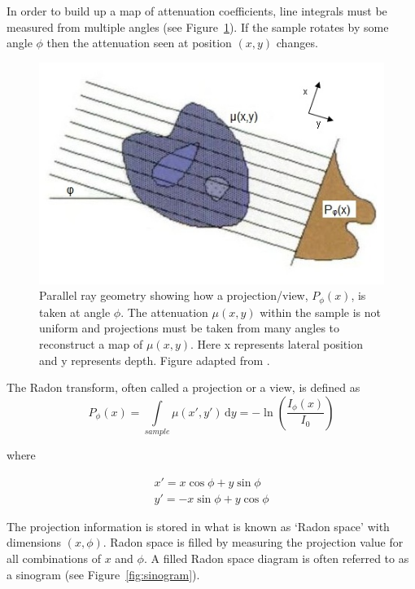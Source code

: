 \documentclass[12pt]{article}
\begin{document}
In order to build up a map of attenuation coefficients, line integrals must be measured from multiple angles (see Figure~\ref{fig:projection}). If the sample rotates by some angle $\phi$ then the attenuation seen at position $(x, y)$  changes.

\begin{figure}[H]
\centering
\includegraphics[scale=0.8]{Russ_projection.jpg}
\caption{Parallel ray geometry showing how a projection/view, $P_{\phi}(x)$, is taken at angle $\phi$. The attenuation $\mu(x,y)$ within the sample is not uniform and projections must be taken from many angles to reconstruct a map of $\mu(x,y)$.  Here x represents lateral position  and y represents  depth. Figure adapted from \cite{russ2002image}.}
\label{fig:projection}
\end{figure}


The Radon transform, often called a projection or a view, is defined as
\begin{equation}
P_{\phi}(x) = \int\limits_{sample} \mu(x',y')\, \mathrm{d}y = -\ln\left(\frac{I_{\phi}(x)}{I_0}\right)
\end{equation}

where 

\begin{equation}
\begin{aligned}
x' = x\cos\phi + y\sin\phi \\
y' = -x\sin\phi + y\cos\phi
\end{aligned}
\end{equation}

The projection information is stored in what is known as `Radon space' with dimensions $(x, \phi)$. Radon space is filled by measuring the projection value for all combinations of $x$ and $\phi$. A filled Radon space diagram is often referred to as a sinogram (see Figure~\ref{fig:sinogram}).
\end{document}
